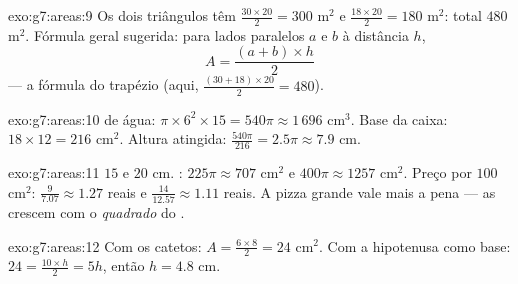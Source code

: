 \begin{solution}{exo:g7:areas:9}
Os dois triângulos têm  $\frac{30 \times 20}{2} = 300$ m$^2$ e
$\frac{18 \times 20}{2} = 180$ m$^2$: total $480$ m$^2$. Fórmula geral
sugerida: para lados paralelos $a$ e $b$ à distância $h$,
\[
A = \frac{(a + b) \times h}{2}
\]
--- a fórmula do trapézio (aqui, $\frac{(30+18)\times 20}{2} = 480$).
\end{solution}

\begin{solution}{exo:g7:areas:10}
 de água: $\pi \times 6^2 \times 15 = 540\pi \approx 1\,696$
cm$^3$. Base da caixa: $18 \times 12 = 216$ cm$^2$. Altura atingida:
$\frac{540\pi}{216} = 2.5\pi \approx 7.9$ cm.
\end{solution}

\begin{solution}{exo:g7:areas:11}
 $15$ e $20$ cm. : $225\pi \approx 707$ cm$^2$ e
$400\pi \approx 1257$ cm$^2$. Preço por $100$ cm$^2$:
$\frac{9}{7.07} \approx 1.27$ reais e
$\frac{14}{12.57} \approx 1.11$ reais. A pizza grande vale mais a pena
--- as  crescem com o \emph{quadrado} do .
\end{solution}

\begin{solution}{exo:g7:areas:12}
Com os catetos: $A = \frac{6 \times 8}{2} = 24$ cm$^2$. Com a
hipotenusa como base: $24 = \frac{10 \times h}{2} = 5h$, então
$h = 4.8$ cm.
\end{solution}

